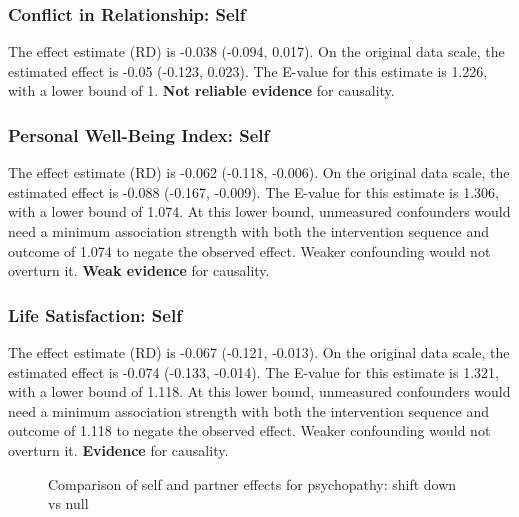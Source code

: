 \documentclass[
  singlecolumn]{article}
\begin{document}
\subsubsection{Conflict in Relationship:
Self}\label{conflict-in-relationship-self-9}

The effect estimate (RD) is -0.038 (-0.094, 0.017). On the original data
scale, the estimated effect is -0.05 (-0.123, 0.023). The E-value for
this estimate is 1.226, with a lower bound of 1. \textbf{Not reliable
evidence} for causality.

\subsubsection{Personal Well-Being Index:
Self}\label{personal-well-being-index-self-9}

The effect estimate (RD) is -0.062 (-0.118, -0.006). On the original
data scale, the estimated effect is -0.088 (-0.167, -0.009). The E-value
for this estimate is 1.306, with a lower bound of 1.074. At this lower
bound, unmeasured confounders would need a minimum association strength
with both the intervention sequence and outcome of 1.074 to negate the
observed effect. Weaker confounding would not overturn it. \textbf{Weak
evidence} for causality.

\subsubsection{Life Satisfaction: Self}\label{life-satisfaction-self-9}

The effect estimate (RD) is -0.067 (-0.121, -0.013). On the original
data scale, the estimated effect is -0.074 (-0.133, -0.014). The E-value
for this estimate is 1.321, with a lower bound of 1.118. At this lower
bound, unmeasured confounders would need a minimum association strength
with both the intervention sequence and outcome of 1.118 to negate the
observed effect. Weaker confounding would not overturn it.
\textbf{Evidence} for causality.

\begin{figure}


\caption{\label{fig-results-psychopathy-self-partner-down-comparison}Comparison
of self and partner effects for psychopathy: shift down vs null}

\end{figure}%
\end{document}
